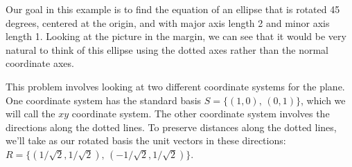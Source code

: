 \begin{example}

%
Our goal in this example is to find the equation of an ellipse that is rotated 45 degrees, centered at the origin, and with major axis length 2 and minor axis length 1.  Looking at the picture in the margin, we can see that it would be very natural to think of this ellipse using the dotted axes rather than the normal coordinate axes.

This problem involves looking at two different coordinate systems for the plane.  
One coordinate system has the standard basis $S = \{(1,0),\,(0,1)\}$, which we will call the $xy$ coordinate system.  
The other coordinate system involves the directions along the dotted lines.  To preserve distances along the dotted lines, we'll take as our rotated basis the unit vectors in these directions: $R=\{(1/\sqrt2,1/\sqrt{2}),\, (-1/\sqrt{2},1/\sqrt{2})\}$.


\end{example}
